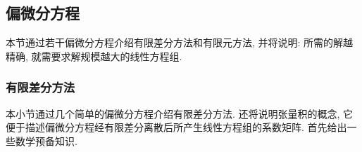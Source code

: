 \subsection{{偏微分方程}}\label{sec:partial-differential-equations}
{本节通过若干偏微分方程介绍有限差分方法和有限元方法, 并将说明: 所需的解越精确, 就需要求解规模越大的线性方程组.}
\subsubsection{{有限差分方法}}\label{subsec:finite-differences}
{本小节通过几个简单的偏微分方程介绍有限差分方法. 还将说明张量积的概念, 它便于描述偏微分方程经有限差分离散后所产生线性方程组的系数矩阵. 首先给出一些数学预备知识.}
